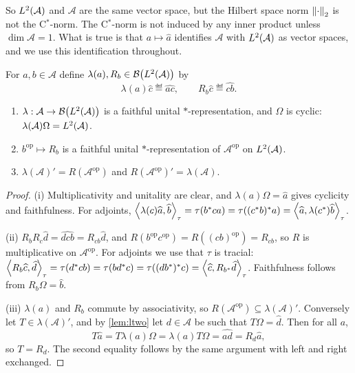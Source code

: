 \documentclass[12pt]{article}
\newcommand{\alg}{\mathcal{A}}             %
\newcommand{\bdd}[1]{\mathcal{B}\br{#1}}   %
\newcommand{\op}{^{\mathrm{op}}}           %
\newcommand{\ip}[2]{\left\langle #1 , #2 \right\rangle}
\newcommand{\Ltwo}{L^2\br{\alg}}           %
\newcommand{\vect}[1]{\widehat{#1}}        %
\begin{document}
\begin{remark}
So \(\Ltwo\) and \(\alg\) are the same vector space, but the Hilbert space norm
\(\left\| \cdot \right\|_2\) is not the C\(^*\)-norm. The C\(^*\)-norm is not induced by any
inner product unless \(\dim \alg = 1\). What is true is that \(a \mapsto \vect{a}\)
identifies \(\alg\) with \(\Ltwo\) as vector spaces, and we use this
identification throughout.
\end{remark}

\begin{definition}
\label{def:regular}
For \(a, b \in \alg\) define \(\lambda(a), R_b \in \bdd{\Ltwo}\) by
\[
  \lambda(a)\vect{c} \eqdef \vect{ac}, \qquad R_b \vect{c} \eqdef \vect{cb}.
\]
\end{definition}

\begin{lemma}
\label{lem:regular}
\begin{enumerate}[label=(\roman*)]
  \item \(\lambda : \alg \to \bdd{\Ltwo}\) is a faithful unital
    \(*\)-representation, and \(\Omega\) is cyclic:
    \(\lambda(\alg)\Omega = \Ltwo\).
  \item \(b\op \mapsto R_b\) is a faithful unital \(*\)-representation of
    \(\alg\op\) on \(\Ltwo\).
  \item \(\lambda(\alg)' = R(\alg\op)\) and \(R(\alg\op)' = \lambda(\alg)\).
\end{enumerate}
\end{lemma}
\begin{proof}
(i) Multiplicativity and unitality are clear, and \(\lambda(a)\Omega = \vect{a}\)
gives cyclicity and faithfulness. For adjoints,
\(\ip{\lambda(c)\vect{a}}{\vect{b}}_{\tau} = \tau(b^\adjoint c a) =
\tau((c^\adjoint b)^\adjoint a) = \ip{\vect{a}}{\lambda(c^\adjoint)\vect{b}}_{\tau}\).

(ii) \(R_b R_c \vect{d} = \vect{dcb} = R_{cb}\vect{d}\), and
\(R(b\op c\op) = R((cb)\op) = R_{cb}\), so \(R\) is multiplicative on \(\alg\op\).
For adjoints we use that \(\tau\) is tracial:
\(\ip{R_b\vect{c}}{\vect{d}}_{\tau} = \tau(d^\adjoint c b) =
\tau(b d^\adjoint c) = \tau((d b^\adjoint)^\adjoint c) =
\ip{\vect{c}}{R_{b^\adjoint}\vect{d}}_{\tau}\).
Faithfulness follows from \(R_b\Omega = \vect{b}\).

(iii) \(\lambda(a)\) and \(R_b\) commute by associativity, so
\(R(\alg\op) \subseteq \lambda(\alg)'\). Conversely let
\(T \in \lambda(\alg)'\), and by \cref{lem:ltwo} let \(d \in \alg\) be such that
\(T\Omega = \vect{d}\). Then for all \(a\),
\[
  T\vect{a} = T\lambda(a)\Omega = \lambda(a)T\Omega = \vect{ad} = R_d\vect{a},
\]
so \(T = R_d\). The second equality follows by the same argument with left and
right exchanged.
\end{proof}
\end{document}
